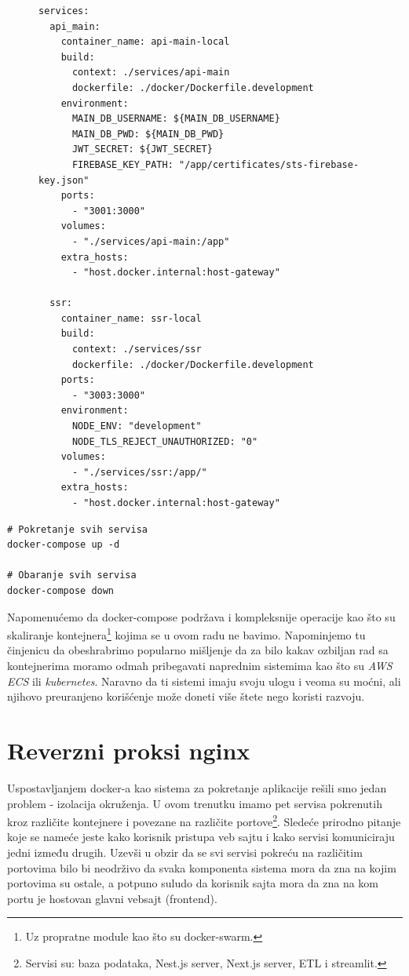 \documentclass[12pt,oneside]{memoir}
\begin{document}
\begin{figure}[h]
\begin{lstlisting}[language=docker-compose, caption={docker-compose konfiguracija nekih razvojnih servisa.}, label={lst:dockercomposelocal}]
services:
  api_main:
    container_name: api-main-local
    build:
      context: ./services/api-main
      dockerfile: ./docker/Dockerfile.development
    environment:
      MAIN_DB_USERNAME: ${MAIN_DB_USERNAME}
      MAIN_DB_PWD: ${MAIN_DB_PWD}
      JWT_SECRET: ${JWT_SECRET}
      FIREBASE_KEY_PATH: "/app/certificates/sts-firebase-key.json"
    ports:
      - "3001:3000"
    volumes:
      - "./services/api-main:/app"
    extra_hosts:
      - "host.docker.internal:host-gateway"

  ssr:
    container_name: ssr-local
    build:
      context: ./services/ssr
      dockerfile: ./docker/Dockerfile.development
    ports:
      - "3003:3000"
    environment:
      NODE_ENV: "development"
      NODE_TLS_REJECT_UNAUTHORIZED: "0"
    volumes:
      - "./services/ssr:/app/"
    extra_hosts:
      - "host.docker.internal:host-gateway"
\end{lstlisting}
\end{figure}

\newpage
\begin{lstlisting}[caption={docker-compose komande.}, label={lst:dockerlocalcommands}]
# Pokretanje svih servisa
docker-compose up -d 

# Obaranje svih servisa
docker-compose down
\end{lstlisting}

Napomenućemo da docker-compose podržava i kompleksnije operacije kao što su skaliranje kontejnera\footnote{Uz propratne module kao što su docker-swarm.} kojima se u ovom radu ne bavimo. Napominjemo tu činjenicu da obeshrabrimo popularno mišljenje da za bilo kakav ozbiljan rad sa kontejnerima moramo odmah pribegavati naprednim sistemima kao što su \textit{AWS ECS} ili \textit{kubernetes}. Naravno da ti sistemi imaju svoju ulogu i veoma su moćni, ali njihovo preuranjeno korišćenje može doneti više štete nego koristi razvoju.


\section{Reverzni proksi nginx}

Uspostavljanjem docker-a kao sistema za pokretanje aplikacije rešili smo jedan problem - izolacija okruženja. U ovom trenutku imamo pet servisa pokrenutih kroz različite kontejnere i povezane na različite portove\footnote{Servisi su: baza podataka, Nest.js server, Next.js server, ETL i streamlit.}. Sledeće prirodno pitanje koje se nameće jeste kako korisnik pristupa veb sajtu i kako servisi komuniciraju jedni između drugih. Uzevši u obzir da se svi servisi pokreću na različitim portovima bilo bi neodrživo da svaka komponenta sistema mora da zna na kojim portovima su ostale, a potpuno suludo da korisnik sajta mora da zna na kom portu je hostovan glavni vebsajt (frontend).
\end{document}
